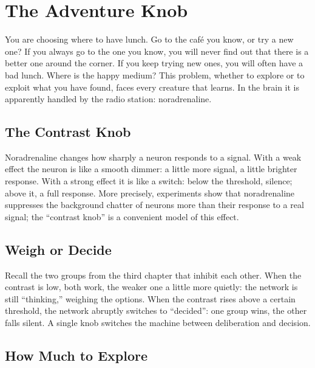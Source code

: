 \chapter{The Adventure Knob}

You are choosing where to have lunch. Go to the café you know, or try a new one? If you always go to the one you know, you will never find out that there is a better one around the corner. If you keep trying new ones, you will often have a bad lunch. Where is the happy medium? This problem, whether to explore or to exploit what you have found, faces every creature that learns. In the brain it is apparently handled by the  radio station: noradrenaline.

\section*{The Contrast Knob}

Noradrenaline changes how sharply a neuron responds to a signal. With a weak effect the neuron is like a smooth dimmer: a little more signal, a little brighter response. With a strong effect it is like a switch: below the threshold, silence; above it, a full response. More precisely, experiments show that noradrenaline suppresses the background chatter of neurons more than their response to a real signal; the ``contrast knob'' is a convenient model of this effect.


\section*{Weigh or Decide}

Recall the two groups from the third chapter that inhibit each other. When the contrast is low, both work, the weaker one a little more quietly: the network is still ``thinking,'' weighing the options. When the contrast rises above a certain threshold, the network abruptly switches to ``decided'': one group wins, the other falls silent. A single knob switches the machine between deliberation and decision.

\section*{How Much to Explore}

